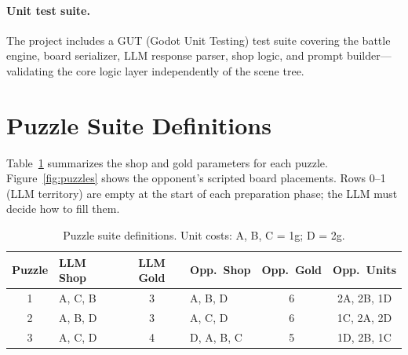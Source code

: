 \documentclass[11pt]{article}
\begin{document}
\paragraph{Unit test suite.}
The project includes a GUT (Godot Unit Testing) test suite covering the battle engine, board serializer, LLM response parser, shop logic, and prompt builder---validating the core logic layer independently of the scene tree.

\section{Puzzle Suite Definitions}\label{sec:puzzles}

Table~\ref{tab:puzzles} summarizes the shop and gold parameters for each puzzle.
Figure~\ref{fig:puzzles} shows the opponent's scripted board placements.
Rows 0--1 (LLM territory) are empty at the start of each preparation phase; the LLM must decide how to fill them.

\begin{table}[h]
\centering
\caption{Puzzle suite definitions. Unit costs: A, B, C = 1g; D = 2g.}
\label{tab:puzzles}
\begin{tabular}{clclcc}
\toprule
\textbf{Puzzle} & \textbf{LLM Shop} & \textbf{LLM Gold} & \textbf{Opp.\ Shop} & \textbf{Opp.\ Gold} & \textbf{Opp.\ Units} \\
\midrule
1 & A, C, B & 3 & A, B, D & 6 & 2A, 2B, 1D \\
2 & A, B, D & 3 & A, C, D & 6 & 1C, 2A, 2D \\
3 & A, C, D & 4 & D, A, B, C & 5 & 1D, 2B, 1C \\
\bottomrule
\end{tabular}
\end{table}
\end{document}
